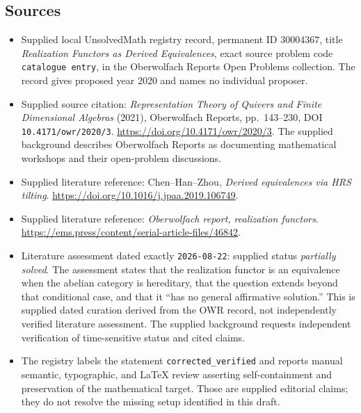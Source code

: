 \documentclass[11pt]{article}
\begin{document}
\subsection{Sources}
\begin{itemize}
\item Supplied local UnsolvedMath registry record, permanent ID \(30004367\), title \emph{Realization Functors as Derived Equivalences}, exact source problem code \texttt{catalogue entry}, in the Oberwolfach Reports Open Problems collection. The record gives proposed year 2020 and names no individual proposer.
\item Supplied source citation: \emph{Representation Theory of Quivers and Finite Dimensional Algebras} (2021), Oberwolfach Reports, pp.~143--230, DOI \texttt{10.4171/owr/2020/3}. \url{https://doi.org/10.4171/owr/2020/3}. The supplied background describes Oberwolfach Reports as documenting mathematical workshops and their open-problem discussions.
\item Supplied literature reference: Chen--Han--Zhou, \emph{Derived equivalences via HRS tilting}. \url{https://doi.org/10.1016/j.jpaa.2019.106749}.
\item Supplied literature reference: \emph{Oberwolfach report, realization functors}. \url{https://ems.press/content/serial-article-files/46842}.
\item Literature assessment dated exactly \texttt{2026-08-22}: supplied status \emph{partially solved}. The assessment states that the realization functor is an equivalence when the abelian category is hereditary, that the question extends beyond that conditional case, and that it ``has no general affirmative solution.'' This is supplied dated curation derived from the OWR record, not independently verified literature assessment. The supplied background requests independent verification of time-sensitive status and cited claims.
\item The registry labels the statement \texttt{corrected\_verified} and reports manual semantic, typographic, and LaTeX review asserting self-containment and preservation of the mathematical target. Those are supplied editorial claims; they do not resolve the missing setup identified in this draft.
\end{itemize}
\end{document}
